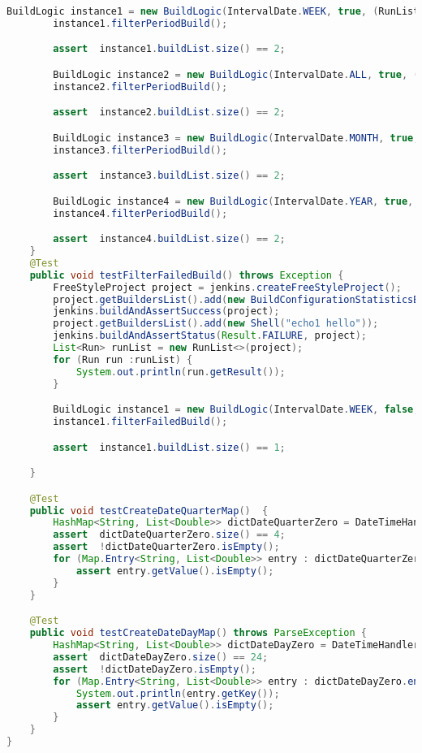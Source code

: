 \begin{lstlisting}[language=Java]
        BuildLogic instance1 = new BuildLogic(IntervalDate.WEEK, true, (RunList<Run>) runList);
        instance1.filterPeriodBuild();

        assert  instance1.buildList.size() == 2;

        BuildLogic instance2 = new BuildLogic(IntervalDate.ALL, true, (RunList<Run>) runList);
        instance2.filterPeriodBuild();

        assert  instance2.buildList.size() == 2;

        BuildLogic instance3 = new BuildLogic(IntervalDate.MONTH, true, (RunList<Run>) runList);
        instance3.filterPeriodBuild();

        assert  instance3.buildList.size() == 2;

        BuildLogic instance4 = new BuildLogic(IntervalDate.YEAR, true, (RunList<Run>) runList);
        instance4.filterPeriodBuild();

        assert  instance4.buildList.size() == 2;
    }
    @Test
    public void testFilterFailedBuild() throws Exception {
        FreeStyleProject project = jenkins.createFreeStyleProject();
        project.getBuildersList().add(new BuildConfigurationStatisticsBuilder());
        jenkins.buildAndAssertSuccess(project);
        project.getBuildersList().add(new Shell("echo1 hello"));
        jenkins.buildAndAssertStatus(Result.FAILURE, project);
        List<Run> runList = new RunList<>(project);
        for (Run run :runList) {
            System.out.println(run.getResult());
        }

        BuildLogic instance1 = new BuildLogic(IntervalDate.WEEK, false, (RunList<Run>) runList);
        instance1.filterFailedBuild();

        assert  instance1.buildList.size() == 1;

    }

    @Test
    public void testCreateDateQuarterMap()  {
        HashMap<String, List<Double>> dictDateQuarterZero = DateTimeHandler.createDateQuarterMap();
        assert  dictDateQuarterZero.size() == 4;
        assert  !dictDateQuarterZero.isEmpty();
        for (Map.Entry<String, List<Double>> entry : dictDateQuarterZero.entrySet()) {
            assert entry.getValue().isEmpty();
        }
    }

    @Test
    public void testCreateDateDayMap() throws ParseException {
        HashMap<String, List<Double>> dictDateDayZero = DateTimeHandler.createDateDayMap();
        assert  dictDateDayZero.size() == 24;
        assert  !dictDateDayZero.isEmpty();
        for (Map.Entry<String, List<Double>> entry : dictDateDayZero.entrySet()) {
            System.out.println(entry.getKey());
            assert entry.getValue().isEmpty();
        }
    }
}

\end{lstlisting}


